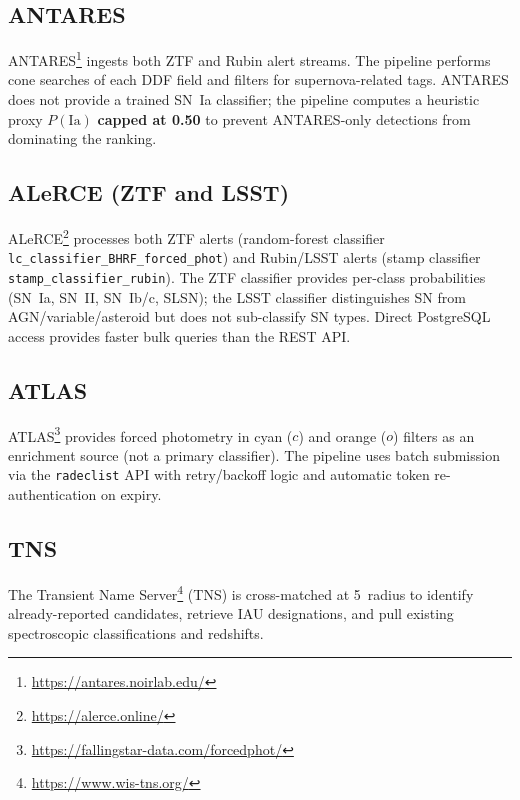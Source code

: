 \documentclass[11pt,letterpaper]{article}
\begin{document}
\subsection{ANTARES}

ANTARES\footnote{\url{https://antares.noirlab.edu/}} ingests both ZTF
and Rubin alert streams.  The pipeline performs cone searches of each
DDF field and filters for supernova-related tags.  ANTARES does not
provide a trained SN~Ia classifier; the pipeline computes a heuristic
proxy $P(\mathrm{Ia})$ \textbf{capped at 0.50} to prevent
ANTARES-only detections from dominating the ranking.

\subsection{ALeRCE (ZTF and LSST)}

ALeRCE\footnote{\url{https://alerce.online/}} processes both ZTF
alerts (random-forest classifier
\texttt{lc\_classifier\_BHRF\_forced\_phot}) and Rubin/LSST alerts
(stamp classifier \texttt{stamp\_classifier\_rubin}).  The ZTF
classifier provides per-class probabilities (SN~Ia, SN~II, SN~Ib/c,
SLSN); the LSST classifier distinguishes SN from AGN/variable/asteroid
but does not sub-classify SN types.  Direct PostgreSQL access provides
faster bulk queries than the REST API.

\subsection{ATLAS}

ATLAS\footnote{\url{https://fallingstar-data.com/forcedphot/}} provides
forced photometry in cyan ($c$) and orange ($o$) filters as an
enrichment source (not a primary classifier).  The pipeline uses batch
submission via the \texttt{radeclist} API with retry/backoff logic and
automatic token re-authentication on expiry.

\subsection{TNS}

The Transient Name Server\footnote{\url{https://www.wis-tns.org/}}
(TNS) is cross-matched at 5\arcsec\ radius to identify
already-reported candidates, retrieve IAU designations, and pull
existing spectroscopic classifications and redshifts.
\end{document}
